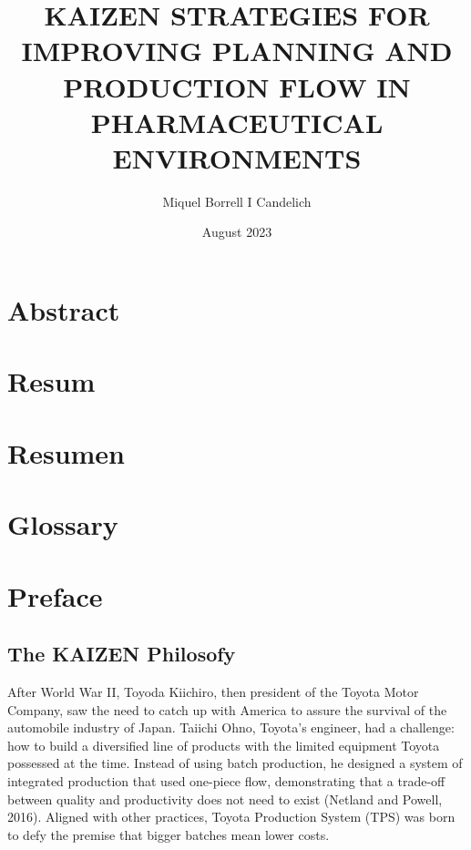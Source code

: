 \documentclass[]{article}
\title{KAIZEN STRATEGIES FOR IMPROVING PLANNING AND PRODUCTION FLOW IN PHARMACEUTICAL ENVIRONMENTS}
\author{Miquel Borrell I Candelich}
\date{August 2023}
\begin{document}
\onehalfspacing
\pagestyle{fancy}
\fancyfoot[C]{\thepage}
\fancyhead[L]{}






\newpage
\newpage

\justifying
\section{Abstract}\label{abstract}
\newpage

\section{Resum}\label{resum}
\newpage

\section{Resumen}\label{resumen}
\newpage

\section{Glossary}
\newpage

\tableofcontents
\clearpage
\newpage

\section{Preface}\label{preface}
\subsection{The KAIZEN Philosofy}\label{philosofy}
After World War II, Toyoda Kiichiro, then president of the Toyota Motor Company, saw the need
to catch up with America to assure the survival of the automobile industry of Japan. Taiichi Ohno,
Toyota’s engineer, had a challenge: how to build a diversified line of products with the limited
equipment Toyota possessed at the time. Instead of using batch production, he designed a system
of integrated production that used one-piece flow, demonstrating that a trade-off between quality
and productivity does not need to exist (Netland and Powell, 2016). Aligned with other practices,
Toyota Production System (TPS) was born to defy the premise that bigger batches mean lower
costs.
\end{document}
